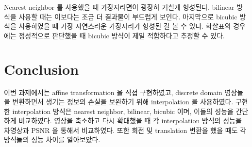 \documentclass[a4paper, 12p]{paper}
\begin{document}
Nearest neighbor 를 사용했을 때 가장자리면이 굉장히 거칠게 형성된다. bilinear 방식을 사용할 때는 이보다는 조금 더 결과물이 부드럽게 보인다. 마지막으로 bicubic 방식을 사용하였을 때 가장 자연스러운 가장자리가 형성된 걸 볼 수 있다. 화살표의 경우에는 정성적으로 판단했을 때 bicubic 방식이 제일 적합하다고 추정할 수 있다.

\section{Conclusion}
이번 과제에서는 affine transformation 을 직접 구현하였고, discrete domain 영상들을 변환하면서 생기는 정보의 손실을 보완하기 위해 interpolation 을 사용하였다. 구현한 interpolation 방식은 nearest neighbor, bilinear, bicubic 이며, 이들의 성능을 간단하게 비교하였다. 영상을 축소하고 다시 확대했을 때 각 interpolation 방식의 성능을 차영상과 PSNR 을 통해서 비교하였다. 또한 회전 및 translation 변환을 했을 때도 각 방식들의 성능 차이를 알아보았다.
\end{document}
